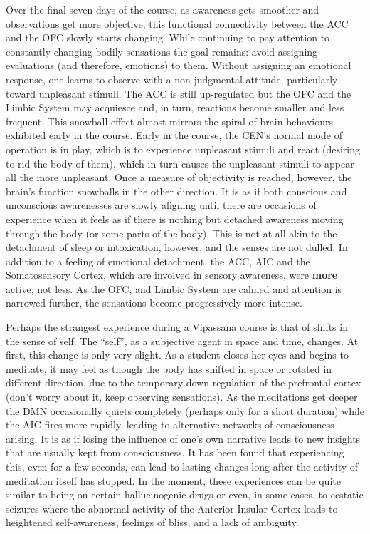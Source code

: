 \documentclass[a4paper, amsfonts, amssymb, amsmath, reprint, showkeys, nofootinbib, twoside]{revtex4-1}
\begin{document}
Over the final seven days of the course, as awareness gets smoother and observations get more objective, this
functional connectivity between the ACC and the OFC slowly starts changing. While
continuing to pay attention to constantly changing bodily sensations the goal remains: avoid
assigning evaluations (and therefore, emotions) to them. Without assigning an
emotional response, one learns to observe with a
non-judgmental attitude, particularly toward unpleasant stimuli. The ACC is still up-regulated 
but the OFC and the Limbic System may acquiesce and, in turn, reactions become smaller and less
frequent. This snowball effect almost mirrors the spiral of brain behaviours
exhibited early in the course. Early in the course, the CEN's normal mode of
operation is in play, which is to experience unpleasant stimuli and react (desiring to rid the body of
them), which in turn causes the unpleasant stimuli to appear all the more
unpleasant. Once a measure of objectivity is reached, however, the brain's function
snowballs in the other direction. It is as if both conscious and unconscious awarenesses are slowly aligning
until there are occasions of experience when it feels as if there is nothing but detached awareness moving
through the body (or some parts of the body). This is not at all akin to the
detachment of sleep or intoxication, however, and the senses are not dulled. In
addition to a feeling of emotional detachment, the ACC, AIC and the Somatosensory
Cortex, which are involved in sensory awareness, were \textbf{more} active, not
less. As the OFC, and Limbic System are calmed and attention is narrowed
further, the sensations become progressively more intense.

Perhaps the strangest experience during a Vipassana course is that of shifts in the
sense of self. The ``self'', as a subjective agent in space and time, changes. At
first, this change is only very slight. As a student closes her eyes and begins to
meditate, it may feel as though the body has shifted in space or rotated in different direction, 
due to the temporary down regulation of the prefrontal cortex (don't worry about it, keep observing
sensations).  As the meditations get deeper the DMN
occasionally quiets completely (perhaps only for a short duration) while the AIC
fires more rapidly, leading to alternative networks of consciousness
arising.  It is
as if losing the influence of one's own narrative leads to new insights that are
usually kept from consciousness. It has been found that experiencing this, even for a
few seconds, can lead to lasting changes long after the activity of meditation itself
has stopped. \cite{alteredtraits} In the moment, these experiences can be quite
similar to being on certain hallucinogenic drugs or even, in some cases, to ecstatic
seizures where the abnormal activity of the Anterior Insular Cortex leads to
heightened self-awareness, feelings of bliss, and a lack of ambiguity. \cite{cortexbliss}
\end{document}
